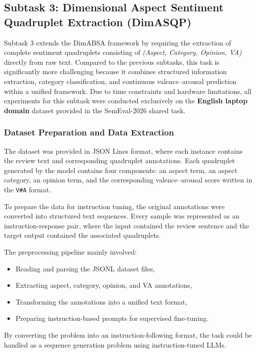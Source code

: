 \documentclass{article}
\begin{document}
\subsection{Subtask 3: Dimensional Aspect Sentiment Quadruplet Extraction (DimASQP)}

Subtask 3 extends the DimABSA framework by requiring the extraction of complete sentiment quadruplets consisting of \textit{(Aspect, Category, Opinion, VA)} directly from raw text. Compared to the previous subtasks, this task is significantly more challenging because it combines structured information extraction, category classification, and continuous valence–arousal prediction within a unified framework. Due to time constraints and hardware limitations, all experiments for this subtask were conducted exclusively on the \textbf{English laptop domain} dataset provided in the SemEval-2026 shared task.

\subsubsection{Dataset Preparation and Data Extraction}

The dataset was provided in JSON Lines format, where each instance contains the review text and corresponding quadruplet annotations. Each quadruplet generated by the model contains four components: an aspect term, an aspect category, an opinion term, and the corresponding valence–arousal score written in the \texttt{V\#A} format.

To prepare the data for instruction tuning, the original annotations were converted into structured text sequences. Every sample was represented as an instruction-response pair, where the input contained the review sentence and the target output contained the associated quadruplets.

The preprocessing pipeline mainly involved:
\begin{itemize}
    \item Reading and parsing the JSONL dataset files,
    \item Extracting aspect, category, opinion, and VA annotations,
    \item Transforming the annotations into a unified text format,
    \item Preparing instruction-based prompts for supervised fine-tuning.
\end{itemize}

By converting the problem into an instruction-following format, the task could be handled as a sequence generation problem using instruction-tuned LLMs.
\end{document}

